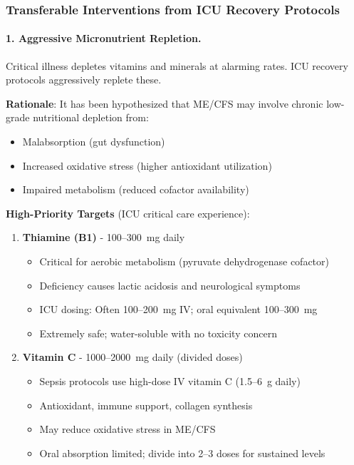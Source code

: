 \subsubsection{Transferable Interventions from ICU Recovery Protocols}

\paragraph{1. Aggressive Micronutrient Repletion.}
Critical illness depletes vitamins and minerals at alarming rates. ICU recovery protocols aggressively replete these.

\begin{tcolorbox}[colback=blue!5!white,colframe=blue!75!black,title=ICU-Derived Micronutrient Protocol for ME/CFS]

\textbf{Rationale}: It has been hypothesized that ME/CFS may involve chronic low-grade nutritional depletion from:
\begin{itemize}
    \item Malabsorption (gut dysfunction)
    \item Increased oxidative stress (higher antioxidant utilization)
    \item Impaired metabolism (reduced cofactor availability)
\end{itemize}

\textbf{High-Priority Targets} (ICU critical care experience):

\begin{enumerate}
    \item \textbf{Thiamine (B1)} - 100--300~mg daily
    \begin{itemize}
        \item Critical for aerobic metabolism (pyruvate dehydrogenase cofactor)
        \item Deficiency causes lactic acidosis and neurological symptoms
        \item ICU dosing: Often 100--200~mg IV; oral equivalent 100--300~mg
        \item Extremely safe; water-soluble with no toxicity concern
    \end{itemize}

    \item \textbf{Vitamin C} - 1000--2000~mg daily (divided doses)
    \begin{itemize}
        \item Sepsis protocols use high-dose IV vitamin C (1.5--6~g daily)
        \item Antioxidant, immune support, collagen synthesis
        \item May reduce oxidative stress in ME/CFS
        \item Oral absorption limited; divide into 2--3 doses for sustained levels
    \end{itemize}


\end{enumerate}
\end{tcolorbox}
